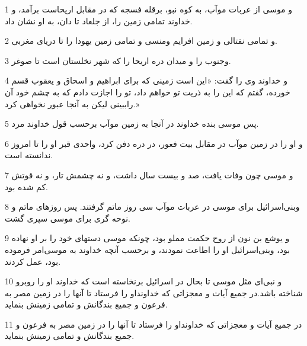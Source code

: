 \par 1 و موسی از عربات موآب، به کوه نبو، برقله فسجه که در مقابل اریحاست برآمد، و خداوند تمامی زمین را، از جلعاد تا دان، به او نشان داد.
\par 2 و تمامی نفتالی و زمین افرایم ومنسی و تمامی زمین یهودا را تا دریای مغربی.
\par 3 وجنوب را و میدان دره اریحا را که شهر نخلستان است تا صوغر.
\par 4 و خداوند وی را گفت: «این است زمینی که برای ابراهیم و اسحاق و یعقوب قسم خورده، گفتم که این را به ذریت تو خواهم داد، تو را اجازت دادم که به چشم خود آن راببینی لیکن به آنجا عبور نخواهی کرد.»
\par 5 پس موسی بنده خداوند در آنجا به زمین موآب برحسب قول خداوند مرد.
\par 6 و او را در زمین موآب در مقابل بیت فعور، در دره دفن کرد، واحدی قبر او را تا امروز ندانسته است.
\par 7 و موسی چون وفات یافت، صد و بیست سال داشت، و نه چشمش تار، و نه قوتش کم شده بود.
\par 8 وبنی‌اسرائیل برای موسی در عربات موآب سی روز ماتم گرفتند. پس روزهای ماتم و نوحه گری برای موسی سپری گشت.
\par 9 و یوشع بن نون از روح حکمت مملو بود، چونکه موسی دستهای خود را بر او نهاده بود، وبنی‌اسرائیل او را اطاعت نمودند، و برحسب آنچه خداوند به موسی‌امر فرموده بود، عمل کردند.
\par 10 و نبی‌ای مثل موسی تا بحال در اسرائیل برنخاسته است که خداوند او را روبرو شناخته باشد.در جمیع آیات و معجزاتی که خداونداو را فرستاد تا آنها را در زمین مصر به فرعون و جمیع بندگانش و تمامی زمینش بنماید.
\par 11 در جمیع آیات و معجزاتی که خداونداو را فرستاد تا آنها را در زمین مصر به فرعون و جمیع بندگانش و تمامی زمینش بنماید.


